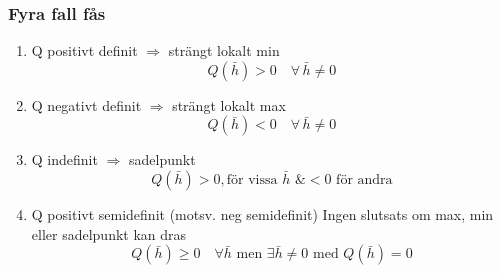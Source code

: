 \documentclass[a4paper]{article}
\begin{document}
\subsubsection{Fyra fall fås}
\begin{enumerate}
\item Q positivt definit $\Rightarrow$ strängt lokalt min
$$
	Q(\bar{h}) > 0 \quad\forall\, \bar{h} \neq 0
$$
\item Q negativt definit $\Rightarrow$ strängt lokalt max
$$
	Q(\bar{h}) < 0 \quad\forall\, \bar{h} \neq 0
$$
\item Q indefinit $\Rightarrow$ sadelpunkt
$$
	Q(\bar{h}) > 0 , \text{för vissa } \bar{h} \text{ \& } < 0 \text{ för andra}
$$
\item Q positivt semidefinit (motsv. neg semidefinit)
Ingen slutsats om max, min eller sadelpunkt kan dras
$$
	Q(\bar{h}) \geq 0 \quad\forall \bar{h} \text{ men } \exists\bar{h} \neq 0 \text{ med } Q(\bar{h}) = 0
$$
\end{enumerate}

\newpage
\end{document}
